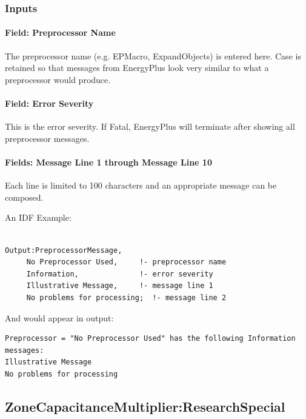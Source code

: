 \subsubsection{Inputs}\label{inputs-13-014}

\paragraph{Field: Preprocessor Name}\label{field-preprocessor-name}

The preprocessor name (e.g. EPMacro, ExpandObjects) is entered here. Case is retained so that messages from EnergyPlus look very similar to what a preprocessor would produce.

\paragraph{Field: Error Severity}\label{field-error-severity}

This is the error severity. If Fatal, EnergyPlus will terminate after showing all preprocessor messages.

\paragraph{Fields: Message Line 1 through Message Line 10}\label{fields-message-line-1-through-message-line-10}

Each line is limited to 100 characters and an appropriate message can be composed.

An IDF Example:

\begin{lstlisting}

Output:PreprocessorMessage,
     No Preprocessor Used,     !- preprocessor name
     Information,              !- error severity
     Illustrative Message,     !- message line 1
     No problems for processing;  !- message line 2
\end{lstlisting}

And would appear in output:

\begin{lstlisting}
Preprocessor = "No Preprocessor Used" has the following Information messages:
Illustrative Message
No problems for processing
\end{lstlisting}

\subsection{ZoneCapacitanceMultiplier:ResearchSpecial}\label{zonecapacitancemultiplierresearchspecial}

